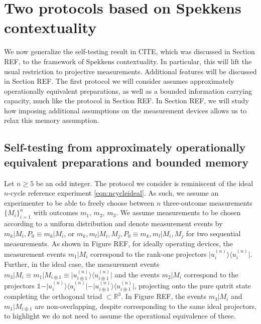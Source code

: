 \chapter{Two protocols based on Spekkens contextuality}
We now generalize the self-testing result in CITE, which was discussed in Section REF, to the framework of Spekkens contextuality. In particular, this will lift the usual restriction to projective measurements. Additional features will be discussed in Section REF. The first protocol we will consider assumes approximately operationally equivalent preparations, as well as a bounded information carrying capacity, much like the protocol in Section REF. In Section REF, we will study how imposing additional assumptions on the measurement devices allows us to relax this memory assumption.
\section{Self-testing from approximately operationally equivalent preparations and bounded memory}
Let $n\geq 5$ be an odd integer. The protocol we consider is reminiscent of the ideal $n$-cycle reference experiment \ref{eqn:ncycleideal}. As such, we assume an experimenter to be able to freely choose between $n$ three-outcome measurements $\{M_i\}_{i=1}^n$ with outcomes $m_1$, $m_2$, $m_3$. We assume measurements to be chosen according to a uniform distribution and denote measurement events by $m_k\vert M_i,P_0 \equiv m_k\vert M_i$, or $m_k,m_l\vert M_i,M_j, P_0 \equiv m_k,m_l\vert M_i,M_j$ for two sequential measurements. As shown in Figure REF, for ideally operating devices, the measurement events $m_1 \vert M_i$ correspond to the rank-one projectors $\vert u_i^{(n)}\rangle\langle u_i^{(n)}\vert$. Further, in the ideal case, the measurement events $m_3\vert M_i\equiv m_1\vert M_{i\oplus 1}\equiv\vert u_{i\oplus 1}^{(n)}\rangle\langle u_{i\oplus 1}^{(n)}\vert$ and the events $m_2\vert M_i$ correspond to the projectors $\mathbb{1}-\vert u_i^{(n)}\rangle\langle u_i^{(n)}\vert-\vert u_{i\oplus 1}^{(n)}\rangle\langle u_{i\oplus 1}^{(n)}\vert$, projecting onto the pure qutrit state completing the orthogonal triad $\subset \mathbb{R}^3$. In Figure REF, the events $m_3 \vert M_i$ and $m_1\vert M_{i\oplus 1}$ are non-overlapping, despite corresponding to the same ideal projectors, to highlight we do not need to assume the operational equivalence of these.

